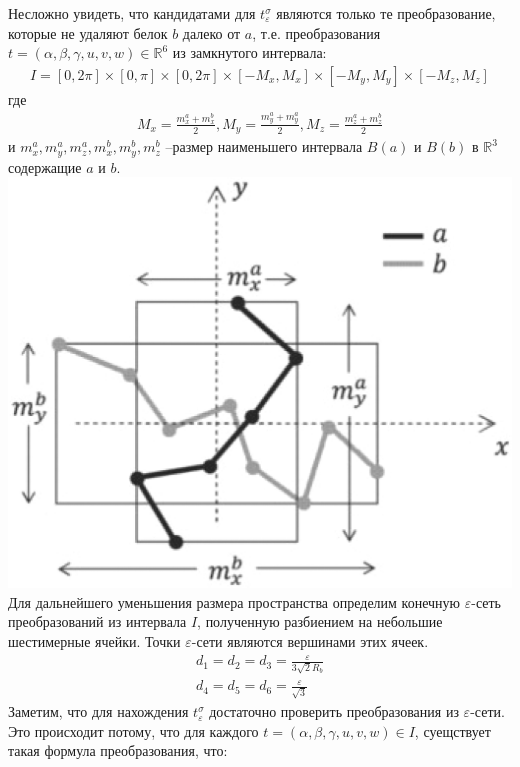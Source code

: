 \documentclass[a4papper]{article}
\newcommand{\eps}{\varepsilon}
\begin{document}
Несложно увидеть, что кандидатами для $t_\eps^\sigma$ являются только те преобразование, которые не удаляют белок $b$ далеко от $a$, т.е. преобразования $t=(\alpha, \beta, \gamma, u, v, w) \in \mathbb{R}^6$ из замкнутого интервала:
\begin{gather*}
I = [0, 2\pi] \times [0, \pi] \times [0, 2\pi] \times [-M_x, M_x] \times [-M_y, M_y] \times [-M_z, M_z]
\end{gather*}
где
\begin{gather*}
M_x = \frac{m_x^a + m_x^b}{2}, M_y = \frac{m_y^a + m_y^a}{2}, M_z = \frac{m_z^a + m_z^b}{2}
\end{gather*}
и $m_x^a, m_y^a, m_z^a, m_x^b, m_y^b, m_z^b$ --размер наименьшего интервала $B(a)$ и $B(b)$ в $\mathbb{R}^3$ содержащие $a$ и $b$.\\
\includegraphics[scale=0.3]{../pictures/btp530f1.jpeg}\\
Для дальнейшего уменьшения размера пространства определим конечную $\eps$-сеть преобразований из интервала $I$, полученную разбиением на небольшие шестимерные ячейки. Точки $\eps$-сети являются вершинами этих ячеек.
\begin{gather}
d_1 = d_2 = d_3 = \frac{\eps}{3\sqrt{2}R_b}\\
d_4 = d_5 = d_6 = \frac{\eps}{\sqrt{3}}
\end{gather}
Заметим, что для нахождения $t_\eps^\sigma$ достаточно проверить преобразования из $\eps$-сети. Это происходит потому, что для каждого $t=(\alpha, \beta, \gamma, u, v, w) \in I$, суещствует такая формула преобразования, что:
\end{document}
